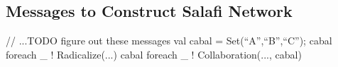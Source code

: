 \documentclass{article}
\newenvironment{rnwfig}[0]{\begin{figure}\begin{center}}{\end{center}\end{figure}}
\newcommand{\todoCP}[1]{\todo{CP, #1}}
\newcommand{\applabel}[1]{\label{app_#1}}
\begin{document}
% 
% 
% 
% 
% 

{}


\begin{appendices}
\section{Messages to Construct Salafi Network}\applabel{sage_network}
\begin{code}
  // ...TODO figure out these messages
  val cabal = Set(``A'',``B'',``C'');
  cabal foreach { _ ! Radicalize(...) }
  cabal foreach { _ ! Collaboration(..., cabal) } 
\end{code}

\end{appendices}
\end{document}
